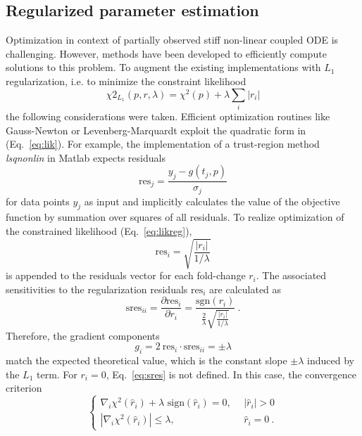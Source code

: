 \documentclass{bioinfo}
\begin{document}
\subsection{Regularized parameter estimation}
Optimization in context of partially observed stiff non-linear coupled ODE is challenging.
However, methods have been developed to efficiently compute solutions to this problem.
To augment the existing implementations with $L_1$ regularization, i.e. to minimize the constraint likelihood
\begin{equation}
	\chi2_{L_1}(p,r,\lambda) = \chi^2(p) + \lambda \sum_i |r_i|
\end{equation}
the following considerations were taken.
Efficient optimization routines like Gauss-Newton or Levenberg-Marquardt exploit the quadratic form in (Eq.~\ref{eq:lik}).
For example, the implementation of a trust-region method \textit{lsqnonlin} in Matlab expects residuals
\begin{equation}
	\text{res}_j = \frac{y_j-g(t_j,p)}{\sigma_j}
\end{equation}
for data points $y_j$ as input and implicitly calculates the value of the objective function by summation over squares of all residuals.
To realize optimization of the constrained likelihood (Eq.~\ref{eq:likreg}),
\begin{equation}
	\text{res}_i = \sqrt{\frac{|r_i|}{1/\lambda}}
\end{equation}
is appended to the residuals vector for each fold-change $r_i$.
The associated sensitivities to the regularization residuals $\text{res}_i$ are calculated as
\begin{equation}
	\text{sres}_{ii} = \frac{\partial \text{res}_i}{\partial r_i} = \frac{\text{sgn}(r_i)}{\frac{2}{\lambda}\sqrt{\frac{|r_i|}{1/\lambda}}} \:.\label{eq:sres}
\end{equation}
Therefore, the gradient components
\begin{equation}
	g_i = 2 \: \text{res}_i \cdot \text{sres}_{ii} = \pm \lambda
\end{equation}
match the expected theoretical value, which is the constant slope $\pm \lambda$ induced by the $L_1$ term.
For $r_i = 0$, Eq.~\ref{eq:sres} is not defined.
In this case, the convergence criterion
\begin{equation}
	\begin{cases}
	\nabla_i \chi^2(\hat r_i) + \lambda \text{ sign}(\hat r_i) = 0, \:\:& |\hat r_i| > 0\\
	|\nabla_i \chi^2(\hat r_i)| \le \lambda, \:\:&\hat r_i = 0 \:.
	\end{cases}
	\label{eq:convcrit}
\end{equation}
\end{document}
